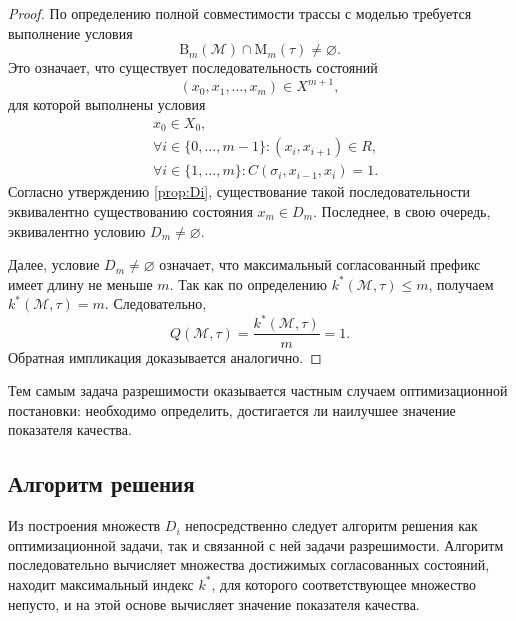 \begin{proof}
По определению полной совместимости трассы с моделью требуется выполнение
условия
\[
\mathrm{B}_m(\mathcal{M}) \cap \mathrm{M}_m(\tau) \neq \varnothing.
\]
Это означает, что существует последовательность состояний
\[
(x_0,x_1,\dots,x_m) \in X^{m+1},
\]
для которой выполнены условия
\[
\begin{aligned}
&x_0 \in X_0, \\
&\forall i \in \{0,\dots,m-1\} : (x_i,x_{i+1}) \in R, \\
&\forall i \in \{1,\dots,m\} : C(\sigma_i,x_{i-1},x_i)=1.
\end{aligned}
\]
Согласно утверждению \ref{prop:Di}, существование такой последовательности
эквивалентно существованию состояния $x_m \in D_m$. Последнее, в свою очередь,
эквивалентно условию $D_m \neq \varnothing$.

Далее, условие $D_m \neq \varnothing$ означает, что максимальный согласованный
префикс имеет длину не меньше $m$. Так как по определению
$k^*(\mathcal{M},\tau) \le m$, получаем $k^*(\mathcal{M},\tau)=m$.
Следовательно,
\[
Q(\mathcal{M},\tau)=\frac{k^*(\mathcal{M},\tau)}{m}=1.
\]
Обратная импликация доказывается аналогично.
\end{proof}

Тем самым задача разрешимости оказывается частным случаем оптимизационной
постановки: необходимо определить, достигается ли наилучшее значение
показателя качества.

\subsection{Алгоритм решения}

Из построения множеств $D_i$ непосредственно следует алгоритм решения как
оптимизационной задачи, так и связанной с ней задачи разрешимости. Алгоритм
последовательно вычисляет множества достижимых согласованных состояний,
находит максимальный индекс $k^*$, для которого соответствующее множество
непусто, и на этой основе вычисляет значение показателя качества.

